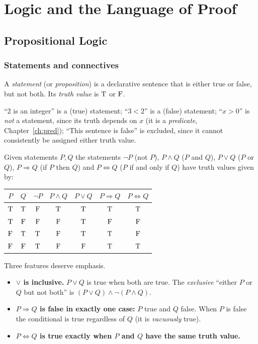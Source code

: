 \part{Logic and the Language of Proof}

\chapter{Propositional Logic}\label{ch:prop}

\section{Statements and connectives}

\begin{definition}[Statement]
	A \emph{statement} (or \emph{proposition}) is a declarative sentence that is either true or false, but not both. Its \emph{truth value} is $\mathrm{T}$ or $\mathrm{F}$.
\end{definition}

\begin{example}
	``$2$ is an integer'' is a (true) statement; ``$3<2$'' is a (false) statement; ``$x>0$'' is \emph{not} a statement, since its truth depends on $x$ (it is a \emph{predicate}, Chapter~\ref{ch:pred}); ``This sentence is false'' is excluded, since it cannot consistently be assigned either truth value.
\end{example}

\begin{definition}[Connectives]\label{def:connectives}
	Given statements $P,Q$ the statements $\neg P$ (not $P$), $P\wedge Q$ ($P$ and $Q$), $P\vee Q$ ($P$ or $Q$), $P\Rightarrow Q$ (if $P$ then $Q$) and $P\Leftrightarrow Q$ ($P$ if and only if $Q$) have truth values given by:
	\begin{center}
		\begin{tabular}{cc|c|c|c|c|c}
			$P$ & $Q$ & $\neg P$ & $P\wedge Q$ & $P\vee Q$ & $P\Rightarrow Q$ & $P\Leftrightarrow Q$\\
			\midrule
			$\mathrm{T}$&$\mathrm{T}$&$\mathrm{F}$&$\mathrm{T}$&$\mathrm{T}$&$\mathrm{T}$&$\mathrm{T}$\\
			$\mathrm{T}$&$\mathrm{F}$&$\mathrm{F}$&$\mathrm{F}$&$\mathrm{T}$&$\mathrm{F}$&$\mathrm{F}$\\
			$\mathrm{F}$&$\mathrm{T}$&$\mathrm{T}$&$\mathrm{F}$&$\mathrm{T}$&$\mathrm{T}$&$\mathrm{F}$\\
			$\mathrm{F}$&$\mathrm{F}$&$\mathrm{T}$&$\mathrm{F}$&$\mathrm{F}$&$\mathrm{T}$&$\mathrm{T}$
		\end{tabular}
	\end{center}
\end{definition}

Three features deserve emphasis.
\begin{itemize}
	\item \textbf{$\vee$ is inclusive.} $P\vee Q$ is true when both are true. The \emph{exclusive} ``either $P$ or $Q$ but not both'' is $(P\vee Q)\wedge\neg(P\wedge Q)$.
	\item \textbf{$P\Rightarrow Q$ is false in exactly one case:} $P$ true and $Q$ false. When $P$ is false the conditional is true regardless of $Q$ (it is \emph{vacuously} true).
	\item \textbf{$P\Leftrightarrow Q$ is true exactly when $P$ and $Q$ have the same truth value.}
\end{itemize}

